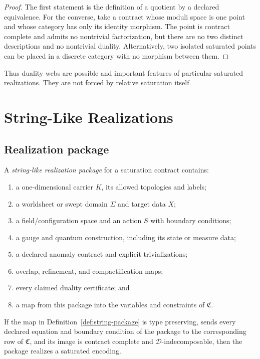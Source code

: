 \documentclass[11pt]{article}
\newcommand{\Contract}{\mathfrak C}
\newcommand{\Decomp}{\mathcal D}
\begin{document}
\begin{proof}
The first statement is the definition of a quotient by a declared
equivalence.  For the converse, take a contract whose moduli space is one
point and whose category has only its identity morphism.  The point is
contract complete and admits no nontrivial factorization, but there are no two
distinct descriptions and no nontrivial duality.  Alternatively, two isolated
saturated points can be placed in a discrete category with no morphism between
them.
\end{proof}

Thus duality webs are possible and important features of particular saturated
realizations.  They are not forced by relative saturation itself.

\section{String-Like Realizations}

\subsection{Realization package}

\begin{definition}\label{def:string-package}
A \emph{string-like realization package} for a saturation contract contains:
\begin{enumerate}
\item a one-dimensional carrier $K$, its allowed topologies and labels;
\item a worldsheet or swept domain $\Sigma$ and target data $X$;
\item a field/configuration space and an action $S$ with boundary conditions;
\item a gauge and quantum construction, including its state or measure data;
\item a declared anomaly contract and explicit trivializations;
\item overlap, refinement, and compactification maps;
\item every claimed duality certificate; and
\item a map from this package into the variables and constraints of
$\Contract$.
\end{enumerate}
\end{definition}

\begin{proposition}\label{prop:string}
If the map in Definition~\ref{def:string-package} is type preserving, sends
every declared equation and boundary condition of the package to the
corresponding row of $\Contract$, and its image is contract complete and
$\Decomp$-indecomposable, then the package realizes a saturated encoding.
\end{proposition}
\end{document}
